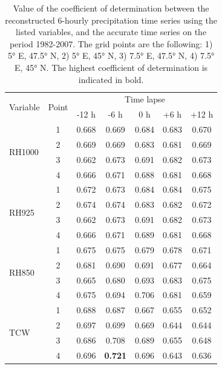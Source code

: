 \documentclass[hess, manuscript]{copernicus}
\begin{document}
\begin{table}[htb]
	\caption{Value of the coefficient of determination between the reconstructed 6-hourly precipitation time series using the listed variables, and the accurate time series on the period 1982-2007. The grid points are the following: 1) 5° E, 47.5° N, 2) 5° E, 45° N, 3) 7.5° E, 47.5° N, 4) 7.5° E, 45° N. The highest coefficient of determination is indicated in bold.}
	\begin{center}
		\begin{tabular}{l c c c c c c}
			\hline
			\multirow{2}{*}{Variable} & \multirow{2}{*}{Point} &  \multicolumn{5}{c}{Time lapse} \\
			&  & -12 h & -6 h & 0 h & +6 h & +12 h \\ 
			\hline
			\multirow{ 4}{*}{RH1000} & 1 & 0.668 & 0.669 & 0.684 & 0.683 & 0.670 \\
			& 2 & 0.669 & 0.669 & 0.683 & 0.681 & 0.669 \\
			& 3 & 0.662 & 0.673 & 0.691 & 0.682 & 0.673 \\
			& 4 & 0.666 & 0.671 & 0.688 & 0.681 & 0.668 \\ \hline
			\multirow{ 4}{*}{RH925} & 1 & 0.672 & 0.673 & 0.684 & 0.684 & 0.675 \\
			& 2 & 0.674 & 0.674 & 0.683 & 0.682 & 0.672 \\
			& 3 & 0.662 & 0.673 & 0.691 & 0.682 & 0.673 \\
			& 4 & 0.666 & 0.671 & 0.689 & 0.681 & 0.668 \\ \hline
			\multirow{ 4}{*}{RH850} & 1 & 0.675 & 0.675 & 0.679 & 0.678 & 0.671 \\
			& 2 & 0.681 & 0.690 & 0.691 & 0.677 & 0.664 \\
			& 3 & 0.665 & 0.680 & 0.693 & 0.683 & 0.675 \\
			& 4 & 0.675 & 0.694 & 0.706 & 0.681 & 0.659 \\ \hline
			\multirow{ 4}{*}{TCW} & 1 & 0.688 & 0.687 & 0.667 & 0.655 & 0.652 \\
			& 2 & 0.697 & 0.699 & 0.669 & 0.644 & 0.644 \\
			& 3 & 0.686 & 0.708 & 0.689 & 0.655 & 0.648 \\
			& 4 & 0.696 & \textbf{0.721} & 0.696 & 0.643 & 0.636 \\ \hline
		\end{tabular}
	\end{center}
	\label{table:proxy_correlations}
\end{table}
\end{document}
